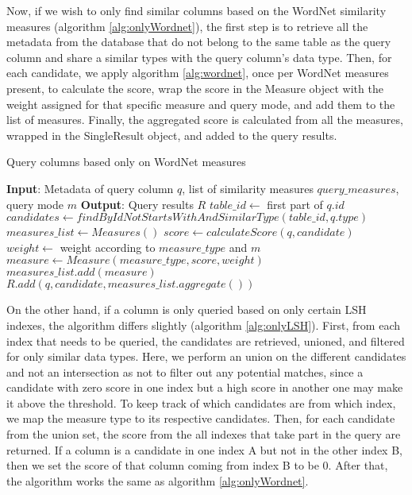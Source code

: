 Now, if we wish to only find similar columns based on the WordNet similarity measures (algorithm \ref{alg:onlyWordnet}), the first step is to retrieve all the metadata from the database that do not belong to the same table as the query column and share a similar types with the query column's data type. Then, for each candidate, we apply algorithm \ref{alg:wordnet}, once per WordNet measures present, to calculate the score, wrap the score in the Measure object with the weight assigned for that specific measure and query mode, and add them to the list of measures. Finally, the aggregated score is calculated from all the measures, wrapped in the SingleResult object, and added to the query results.

\begin{algorithm}
    \caption{Query columns based only on WordNet measures}
    \label{alg:onlyWordnet}
    \begin{algorithmic}[1]
\STATE \textbf{Input}: Metadata of query column $q$, list of similarity measures $query\_measures$, query mode $m$
\STATE \textbf{Output}: Query results $R$
\STATE $table\_id \gets$ first part of $q.id$ 
\STATE $candidates \gets findByIdNotStartsWithAndSimilarType(table\_id, q.type)$
\STATE $measures\_list \gets Measures()$
\STATE $score \gets calculateScore(q, candidate)$
\STATE $weight \gets$ weight according to $measure\_type$ and $m$
\STATE $measure \gets Measure(measure\_type, score, weight)$
\STATE $measures\_list.add(measure)$
\ENDFOR
\STATE $R.add(q, candidate, measures\_list.aggregate())$
\ENDFOR
    \end{algorithmic}
\end{algorithm}

On the other hand, if a column is only queried based on only certain LSH indexes, the algorithm differs slightly (algorithm \ref{alg:onlyLSH}). First, from each index that needs to be queried, the candidates are retrieved, unioned, and filtered for only similar data types. Here, we perform an union on the different candidates and not an intersection as not to filter out any potential matches, since a candidate with zero score in one index but a high score in another one may make it above the threshold. To keep track of which candidates are from which index, we map the measure type to its respective candidates. Then, for each candidate from the union set, the score from the all indexes that take part in the query are returned. If a column is a candidate in one index A but not in the other index B, then we set the score of that column coming from index B to be 0. After that, the algorithm works the same as algorithm \ref{alg:onlyWordnet}.

